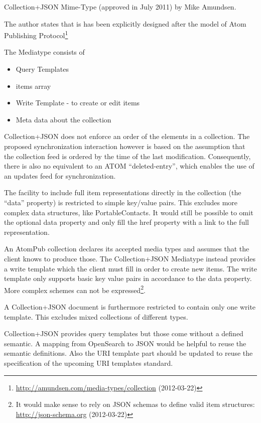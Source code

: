 \documentclass[12pt,a4paper,twoside]{scrartcl}		%
\newcommand{\citeurl}[2]{\url{#1} (#2)}
\begin{document}
Collection+JSON Mime-Type (approved in July 2011) by Mike Amundsen\cite{Amundsen2011a}\cite[ch. 3]{amundsen2011building}.

The author states that is has been explicitly designed after the model of Atom Publishing
Protocol\footnote{\citeurl{http://amundsen.com/media-types/collection}{2012-03-22}}

The Mediatype consists of

\begin{itemize}
\item Query Templates
\item items array
\item Write Template - to create or edit items
\item Meta data about the collection

\end{itemize}



Collection+JSON does not enforce an order of the elements in a collection. The
proposed synchronization interaction however is based on the assumption that the
collection feed is ordered by the time of the last modification. Consequently,
there is also no equivalent to an ATOM
``deleted-entry''\cite{draft-snell-atompub-tombstones-14}, which enables the use
of an updates feed for synchronization.

The facility to include full item representations directly in the collection
(the ``data'' property) is restricted to simple key/value pairs. This excludes
more complex data structures, like PortableContacts. It would still be possible
to omit the optional data property and only fill the href property with a link
to the full representation.

An AtomPub collection declares its accepted media types and assumes that the
client knows to produce those. The Collection+JSON Mediatype instead provides a
write template which the client must fill in order to create new items. The
write template only supports basic key value pairs in accordance to the data
property. More complex schemes can not be expressed\footnote{It would make sense
  to rely on JSON schemas to define valid item structures:
  \citeurl{http://json-schema.org}{2012-03-22}}.

A Collection+JSON document is furthermore restricted to contain only one write
template. This excludes mixed collections of different types.

Collection+JSON provides query templates but those come without a defined
semantic. A mapping from OpenSearch to JSON would be helpful to reuse the
semantic definitions. Also the URI template part should be updated to reuse the
specification of the upcoming URI templates standard\cite{Gregorio2012}.
\end{document}
